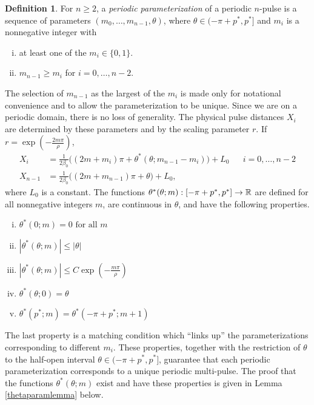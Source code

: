 \documentclass[10pt,reqno]{amsart}
\theoremstyle{plain}
\theoremstyle{definition}
\newtheorem{definition}[theorem]{Definition}
\theoremstyle{remark}
\numberwithin{theorem}{section}
\numberwithin{equation}{section}
\begin{document}
\begin{definition}\label{def:perparam}
For $n \geq 2$, a \emph{periodic parameterization} of a periodic $n$-pulse is a sequence of parameters $(m_0, \dots, m_{n-1}, \theta)$, where $\theta \in (-\pi + p^*, p^*]$ and $m_i$ is a nonnegative integer with
\begin{enumerate}[(i)]
\item at least one of the $m_i \in \{0, 1\}$.
\item $m_{n-1} \geq m_i$ for $i = 0, \dots, n-2$.
\end{enumerate}
\end{definition}
\noi The selection of $m_{n-1}$ as the largest of the $m_i$ is made only for notational convenience and to allow the parameterization to be unique. Since we are on a periodic domain, there is no loss of generality. The physical pulse distances $X_i$ are determined by these parameters and by the scaling parameter $r$. 
If $r = \exp\left(-\frac{2 m \pi}{\rho}\right)$,
\begin{align*}
X_i &= \frac{1}{2 \beta_0}\big( (2 m + m_i)\pi + \theta^*(\theta; m_{n-1} - m_i)\big) + L_0 && i = 0, \dots, n-2  \\
X_{n-1} &= \frac{1}{2 \beta_0}\big( (2 m + m_{n-1})\pi + \theta \big) + L_0,
\end{align*}
where $L_0$ is a constant. 
The functions $\theta^*(\theta; m): [-\pi + p^*, p^*] \rightarrow \mathbb{R}$ are defined for all nonnegative integers $m$, are continuous in $\theta$, and have the following properties.
\begin{enumerate}[(i)]
\item $\theta^*(0; m) = 0 \text{ for all } m$
\item $|\theta^*(\theta; m)| \leq |\theta|$
\item $|\theta^*(\theta; m)| \leq C \exp\left(-\frac{m \pi}{\rho} \right)$
\item $\theta^*(\theta; 0) = \theta $
\item $\theta^*(p^*; m) = \theta^*(-\pi+p^*; m+1)$
\end{enumerate}
The last property is a matching condition which ``links up'' the parameterizations corresponding to different $m_i$. These properties, together with the restriction of $\theta$ to the half-open interval $\theta \in (-\pi + p^*, p^*]$, guarantee that each periodic parameterization corresponds to a unique periodic multi-pulse. The proof that the functions $\theta^*(\theta; m)$ exist and have these properties is given in Lemma \ref{thetaparamlemma} below.
\end{document}
